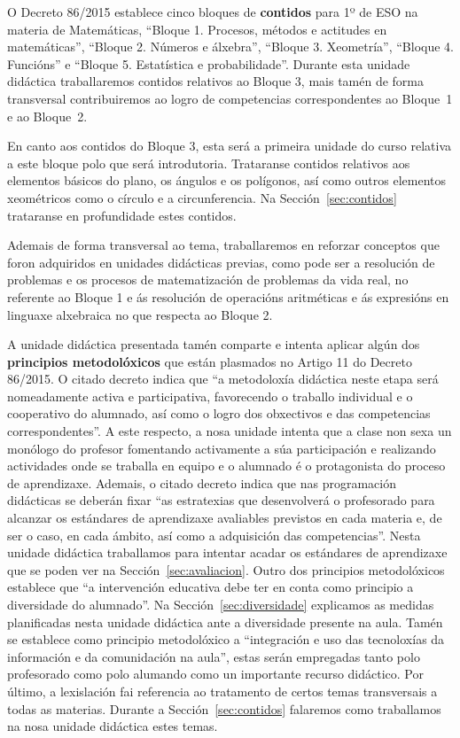 O Decreto 86/2015 establece cinco bloques de \textbf{contidos} para 1º de ESO na materia de Matemáticas, ``Bloque 1. Procesos, métodos e actitudes en matemáticas'', ``Bloque 2. Números e álxebra'', ``Bloque 3. Xeometría'', ``Bloque 4. Funcións'' e ``Bloque 5. Estatística e probabilidade''. Durante esta unidade didáctica traballaremos contidos relativos ao Bloque 3, mais tamén de forma transversal contribuiremos ao logro de competencias correspondentes ao Bloque~1 e ao Bloque~2.

En canto aos contidos do Bloque 3, esta será a primeira unidade do curso relativa a este bloque polo que será introdutoria. Trataranse contidos relativos aos elementos básicos do plano, os ángulos e os polígonos, así como outros elementos xeométricos como o círculo e a circunferencia. Na Sección~\ref{sec:contidos} trataranse en profundidade estes contidos.

Ademais de forma transversal ao tema, traballaremos en reforzar conceptos que foron adquiridos en unidades didácticas previas, como pode ser a resolución de problemas e os procesos de matematización de problemas da vida real, no referente ao Bloque 1 e ás resolución de operacións aritméticas e ás expresións en linguaxe alxebraica no que respecta ao Bloque 2.

A unidade didáctica presentada tamén comparte e intenta aplicar algún dos \textbf{principios metodolóxicos} que están plasmados no Artigo 11 do Decreto 86/2015. O citado decreto indica que ``a metodoloxía didáctica neste etapa será nomeadamente activa e participativa, favorecendo o traballo individual e o cooperativo do alumnado, así como o logro dos obxectivos e das competencias correspondentes''. A este respecto, a nosa unidade intenta que a clase non sexa un monólogo do profesor fomentando activamente a súa participación e realizando actividades onde se traballa en equipo e o alumnado é o protagonista do proceso de aprendizaxe. Ademais, o citado decreto indica que nas programación didácticas se deberán fixar ``as estratexias que desenvolverá o profesorado para alcanzar os estándares de aprendizaxe avaliables previstos en cada materia e, de ser o caso, en cada ámbito, así como a adquisición das competencias''. Nesta unidade didáctica traballamos para intentar acadar os estándares de aprendizaxe que se poden ver na Sección~\ref{sec:avaliacion}. Outro dos principios metodolóxicos establece que ``a intervención educativa debe ter en conta como principio a diversidade do alumnado''. Na Sección~\ref{sec:diversidade} explicamos as medidas planificadas nesta unidade didáctica ante a diversidade presente na aula. Tamén se establece como principio metodolóxico a ``integración e uso das tecnoloxías da información e da comunidación na aula'', estas serán empregadas tanto polo profesorado como polo alumando como un importante recurso didáctico. Por último, a lexislación fai referencia ao tratamento de certos temas transversais a todas as materias. Durante a Sección~\ref{sec:contidos} falaremos como traballamos na nosa unidade didáctica estes temas.

